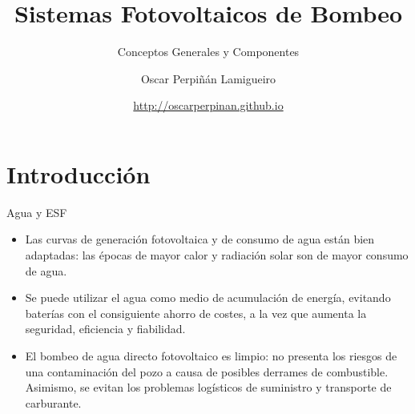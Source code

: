 \documentclass[xcolor={usenames,svgnames,dvipsnames}]{beamer}
\author{Oscar Perpiñán Lamigueiro}
\date{\url{http://oscarperpinan.github.io}}
\title{Sistemas Fotovoltaicos de Bombeo}
\subtitle{Conceptos Generales y Componentes}
\begin{document}
\maketitle

\section{Introducción}
\label{sec:orgd85839c}

\begin{frame}[label={sec:orgd66dd59}]{Agua y ESF}
\begin{itemize}
\item Las \alert{curvas de generación fotovoltaica y de consumo de agua están bien adaptadas}: las épocas de mayor calor y radiación solar son de mayor consumo de agua.

\item Se puede utilizar el \alert{agua como medio de acumulación de energía}, evitando baterías con el consiguiente ahorro de costes, a la vez que aumenta la seguridad, eficiencia y fiabilidad.

\item El bombeo de agua directo fotovoltaico es limpio: \alert{no presenta los riesgos de una contaminación del pozo a causa de posibles derrames de combustible}. Asimismo, se evitan los problemas logísticos de suministro y transporte de carburante.
\end{itemize}
\end{frame}
\end{document}
